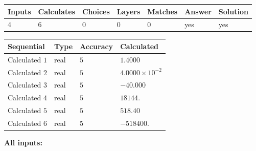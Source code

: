 \documentclass[12pt]{article}
\begin{document}
 
 
\noindent{}
 
 

 
\vspace{0.3in}
   
   
   
   
\noindent\begin{tabular}{|l|l|l|l|l|l|l|}
 \hline
Inputs & Calculates & Choices & Layers & Matches & Answer & Solution \\ \hline
           4 & 
           6 & 
           0
  & 
           0 & 
           0 & 
  yes & 
  yes 
  \\ \hline
 \end{tabular}
   
   
   
   
\noindent{}
   
   
  
  
\noindent\begin{tabular}{|l|l|l|l|}
\hline
 Sequential & Type & Accuracy & Calculated \\ 
\hline
 
 
  Calculated $           1$ & real & $           5 $ & 
 $ 1.4000 $ 
 \\  \hline  
 
 
  Calculated $           2$ & real & $           5 $ & 
 $ 4.0000 \times 10^{-2} $ 
 \\  \hline  
 
 
  Calculated $           3$ & real & $           5 $ & 
 $ -40.000 $ 
 \\  \hline  
 
 
  Calculated $           4$ & real & $           5 $ & 
 $ 18144. $ 
 \\  \hline  
 
 
  Calculated $           5$ & real & $           5 $ & 
 $ 518.40 $ 
 \\  \hline  
 
 
  Calculated $           6$ & real & $           5 $ & 
 $ -518400. $ 
 \\  \hline  
 \end{tabular}
   
   
   
   
\noindent\vspace{0.1in}\hspace{-0.08in} {\textbf{\Large{All inputs: }}}
   
\end{document}
